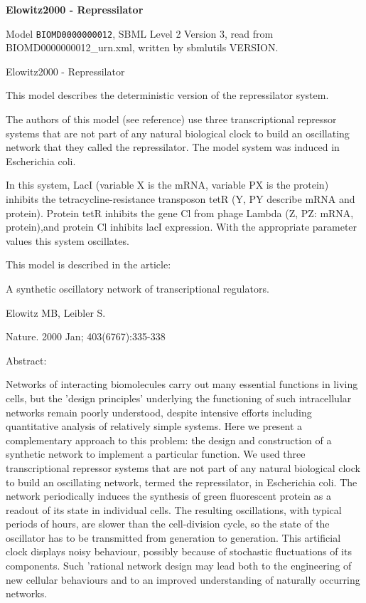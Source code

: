 \documentclass{article}
\begin{document}
{\centering\LARGE\bfseries Elowitz2000 - Repressilator\par}
\bigskip

Model \texttt{BIOMD0000000012}, SBML Level 2 Version 3, read from BIOMD0000000012\_\allowbreak{}urn.xml, written by sbmlutils VERSION.

Elowitz2000 - Repressilator

This model describes the deterministic version of the repressilator system.

The authors of this model (see reference) use three transcriptional repressor systems that are not part of any natural biological clock to build an oscillating network that they called the repressilator. The model system was induced in Escherichia coli.

In this system, LacI (variable X is the mRNA, variable PX is the protein) inhibits the tetracycline-resistance transposon tetR (Y, PY describe mRNA and protein). Protein tetR inhibits the gene Cl from phage Lambda (Z, PZ: mRNA, protein),and protein Cl inhibits lacI expression. With the appropriate parameter values this system oscillates.

This model is described in the article:

A synthetic oscillatory network of transcriptional regulators.

Elowitz MB, Leibler S.

Nature. 2000 Jan; 403(6767):335-338

Abstract:

Networks of interacting biomolecules carry out many essential functions in living cells, but the 'design principles' underlying the functioning of such intracellular networks remain poorly understood, despite intensive efforts including quantitative analysis of relatively simple systems. Here we present a complementary approach to this problem: the design and construction of a synthetic network to implement a particular function. We used three transcriptional repressor systems that are not part of any natural biological clock to build an oscillating network, termed the repressilator, in Escherichia coli. The network periodically induces the synthesis of green fluorescent protein as a readout of its state in individual cells. The resulting oscillations, with typical periods of hours, are slower than the cell-division cycle, so the state of the oscillator has to be transmitted from generation to generation. This artificial clock displays noisy behaviour, possibly because of stochastic fluctuations of its components. Such 'rational network design may lead both to the engineering of new cellular behaviours and to an improved understanding of naturally occurring networks.
\end{document}
